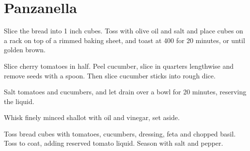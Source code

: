 \section{Panzanella}
\begin{recipe}



Slice the bread into 1 inch cubes. Toss with olive oil and salt and place cubes on a rack on top of a rimmed baking sheet, and toast at 400\degree{} for 20 minutes, or until golden brown.


Slice cherry tomatoes in half. Peel cucumber, slice in quarters lengthwise and remove seeds with a spoon. Then slice cucumber sticks into rough dice.

Salt tomatoes and cucumbers, and let drain over a bowl for 20 minutes, reserving the liquid.


Whisk finely minced shallot with oil and vinegar, set aside.


Toss bread cubes with tomatoes, cucumbers, dressing, feta and chopped basil. Toss to coat, adding reserved tomato liquid. Season with salt and pepper.

\end{recipe}
